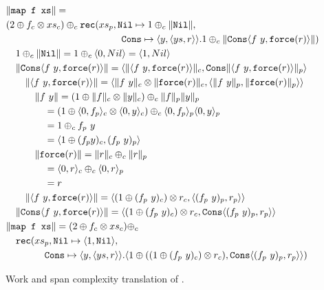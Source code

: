 \begin{figure}
  \label{fig:ws_map_complexity_translation}
  \caption{Work and span complexity translation of .}
  \[\begin{split}
    &\|\texttt{map f xs}\| = \\
    &  (2 \oplus f_c \otimes xs_c) \oplus_c \texttt{rec}(xs_p, \texttt{Nil}\mapsto 1 \oplus_c \|\texttt{Nil}\|, \\
    &\qquad\quad\quad\quad\qquad\quad\quad\quad\qquad \texttt{Cons} \mapsto \langle y, \langle ys, r \rangle \rangle. 1 \oplus_c \|\texttt{Cons}\langle f\ y, \texttt{force}(r)\rangle \|) \\
    &\quad 1 \oplus_c \|\texttt{Nil}\| = 1 \oplus_c \langle 0, Nil \rangle = \langle 1, Nil \rangle \\
    &\quad\|\texttt{Cons}\langle f\ y, \texttt{force}(r)\rangle \| = \langle \|\langle f\ y, \texttt{force}(r)\rangle\|_c, \texttt{Cons} \| \langle f\ y, \texttt{force}(r)\rangle \|_p\rangle \\
    &\qquad \|\langle f\ y, \texttt{force}(r)\rangle\| = \langle \|f\ y\|_c \otimes \|\texttt{force}(r)\|_c, \langle \|f\ y\|_p, \|\texttt{force}(r)\|_p\rangle\rangle \\
    &\qquad\quad \|f\ y\| = (1 \oplus \|f\|_c \otimes \|y\|_c) \oplus_c \|f\|_p \|y\|_p \\
    &\qquad\quad\quad = (1 \oplus \langle 0, f_p \rangle_c \otimes \langle 0, y \rangle_c) \oplus_c \langle 0, f_p \rangle_p \langle 0, y \rangle_p \\
    &\qquad\quad\quad = 1 \oplus_c f_p\ y \\
    &\qquad\quad\quad = \langle 1 \oplus (f_p y)_c, (f_p\ y)_p \rangle \\
    &\qquad\quad \|\texttt{force}(r)\| = \|r\|_c \oplus_c \|r\|_p \\
    &\qquad\quad\quad = \langle 0, r \rangle_c \oplus_c \langle 0, r \rangle_p \\
    &\qquad\quad\quad = r \\
    &\qquad \|\langle f\ y, \texttt{force}(r)\rangle\| = \langle (1 \oplus (f_p\ y)_c) \otimes r_c, \langle (f_p\ y)_p, r_p \rangle \rangle \\
    &\quad\|\texttt{Cons}\langle f\ y, \texttt{force}(r)\rangle \| = \langle (1 \oplus (f_p\ y)_c) \otimes r_c, \texttt{Cons} \langle (f_p\ y)_p, r_p \rangle \rangle \\
    &\|\texttt{map f xs}\| = (2 \oplus f_c \otimes xs_c) \oplus_c \\
    &\quad \texttt{rec}(xs_p, \texttt{Nil}\mapsto \langle 1, \texttt{Nil}\rangle, \\
    &\qquad\quad\quad \texttt{Cons} \mapsto \langle y, \langle ys, r \rangle \rangle. \langle 1 \oplus ((1 \oplus (f_p\ y)_c) \otimes r_c), \texttt{Cons} \langle (f_p\ y)_p, r_p \rangle \rangle)
  \end{split}\]
\end{figure}
